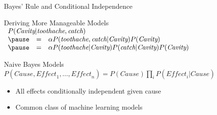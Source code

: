 \documentclass[14pt]{beamer}
\begin{document}
\begin{frame}{Bayes' Rule and Conditional Independence}
	\begin{block}{Deriving More Manageable Models}
		$
		\begin{array}{lll}
		\lefteqn{P(\textit{Cavity}|\textit{toothache}, \textit{catch})} \\
		\pause
		& = & \alpha\displaystyle P(\textit{toothache}, \textit{catch}|\textit{Cavity})
		                          P(\textit{Cavity}) \\
		\pause
		& = & \alpha\displaystyle P(\textit{toothache}|\textit{Cavity})
		                          P(\textit{catch}|\textit{Cavity})
		                          P(\textit{Cavity}) \\
		\end{array}
		$
	\end{block}
	\pause
	\begin{block}{Naive Bayes Models}
		\small
		$
		P(\textit{Cause},\textit{Effect}_{1},\ldots,\textit{Effect}_{n})
		 = P(\textit{Cause})\prod_{i}{P(\textit{Effect}_{i}|\textit{Cause})}
		$
		\normalsize
		\begin{itemize}
			\item All effects conditionally independent given cause
			\item Common class of machine learning models
		\end{itemize}
	\end{block}
\end{frame}
\end{document}
